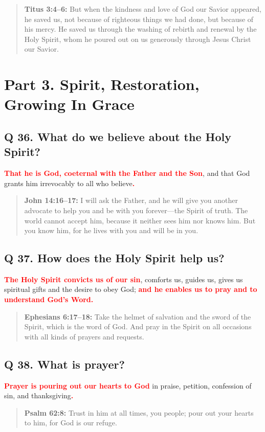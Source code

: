 \documentclass[]{memoir}
\newcommand\Children[1]{\textbf{\textcolor{red}{#1}}}
\newcommand\Quote[2]{\begin{quote}{\textbf{#1:}{ #2}}\end{quote}}
\begin{document}
\Quote{Titus 3:4--6}{But when the kindness and love of God our Savior appeared, he saved us, not because of righteous things we had done, but because of his mercy. He saved us through the washing of rebirth and renewal by the Holy Spirit, whom he poured out on us generously through Jesus Christ our Savior.}

\section[Part 3. Spirit, Restoration, Growing In Grace][Spirit, Restoration, Growing In Grace]{Part 3. Spirit, Restoration, Growing In Grace}

\subsection{Q 36. What do we believe about the Holy Spirit?}
\Children{That he is God, coeternal with the Father and the Son}, and that God grants him irrevocably to all who believe\Children{.}

\Quote{John 14:16--17}{I will ask the Father, and he will give you another advocate to help you and be with you forever\thinspace{}---\thinspace{}the Spirit of truth. The world cannot accept him, because it neither sees him nor knows him. But you know him, for he lives with you and will be in you.}

\subsection{Q 37. How does the Holy Spirit help us?}
\Children{The Holy Spirit convicts us of our sin}, comforts us, guides us, gives us spiritual gifts and the desire to obey God; \Children{and he enables us to pray and to understand God's Word.}

\Quote{Ephesians 6:17--18}{Take the helmet of salvation and the sword of the Spirit, which is the word of God. And pray in the Spirit on all occasions with all kinds of prayers and requests.}

\subsection{Q 38. What is prayer?}
\Children{Prayer is pouring out our hearts to God} in praise, petition, confession of sin, and thanksgiving\Children{.}

\Quote{Psalm 62:8}{Trust in him at all times, you people; pour out your hearts to him, for God is our refuge.}
\end{document}
